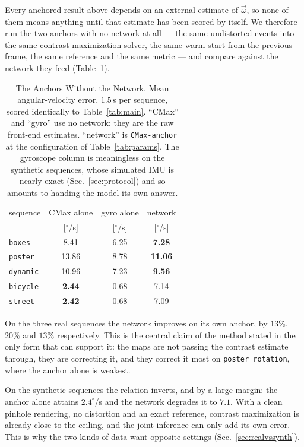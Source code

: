 \documentclass[journal]{IEEEtran}
\newcommand{\wvec}{\vec{\omega}}
\begin{document}
Every anchored result above depends on an external estimate of $\wvec$, so none
of them means anything until that estimate has been scored by itself. We
therefore run the two anchors with no network at all --- the same undistorted
events into the same contrast-maximization solver, the same warm start from the
previous frame, the same reference and the same metric --- and compare against
the network they feed (Table~\ref{tab:baseline}).

\begin{table}[!t]
\renewcommand{\arraystretch}{1.15}
\caption{The Anchors Without the Network. \textnormal{Mean angular-velocity
error, $1.5$\,s per sequence, scored identically to Table~\ref{tab:main}.
``CMax'' and ``gyro'' use no network: they are the raw front-end estimates.
``network'' is \texttt{CMax-anchor} at the configuration of
Table~\ref{tab:params}. The gyroscope column is meaningless on the synthetic
sequences, whose simulated IMU is nearly exact (Sec.~\ref{sec:protocol}) and so
amounts to handing the model its own answer.}}
\label{tab:baseline}
\centering
\footnotesize
\begin{tabular}{@{}lccc@{}}
\toprule
sequence & CMax alone & gyro alone & network \\
 & [$^\circ$/s] & [$^\circ$/s] & [$^\circ$/s] \\
\midrule
\texttt{boxes}   &  8.41 & 6.25 & \textbf{7.28} \\
\texttt{poster}  & 13.86 & 8.78 & \textbf{11.06} \\
\texttt{dynamic} & 10.96 & 7.23 & \textbf{9.56} \\
\midrule
\texttt{bicycle} & \textbf{2.44} & 0.68 & 7.14 \\
\texttt{street}  & \textbf{2.42} & 0.68 & 7.09 \\
\bottomrule
\end{tabular}
\end{table}

On the three real sequences the network improves on its own anchor, by $13\%$,
$20\%$ and $13\%$ respectively. This is the central claim of the method stated
in the only form that can support it: the maps are not passing the contrast
estimate through, they are correcting it, and they correct it most on
\texttt{poster\_rotation}, where the anchor alone is weakest.

On the synthetic sequences the relation inverts, and by a large margin: the
anchor alone attains $2.4^\circ$/s and the network degrades it to $7.1$. With a
clean pinhole rendering, no distortion and an exact reference, contrast
maximization is already close to the ceiling, and the joint inference can only
add its own error. This is why the two kinds of data want opposite settings
(Sec.~\ref{sec:realvssynth}).
\end{document}
